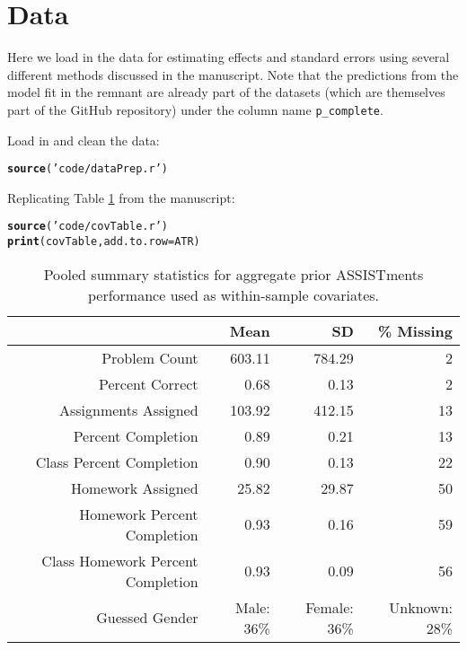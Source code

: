 \documentclass[12pt]{article}\usepackage[]{graphicx}\usepackage[]{color}
\makeatletter
\newcommand{\hlstr}[1]{\textcolor[rgb]{0.192,0.494,0.8}{#1}}%
\newcommand{\hlstd}[1]{\textcolor[rgb]{0.345,0.345,0.345}{#1}}%
\newcommand{\hlkwc}[1]{\textcolor[rgb]{0.333,0.667,0.333}{#1}}%
\newcommand{\hlkwd}[1]{\textcolor[rgb]{0.737,0.353,0.396}{\textbf{#1}}}%
\newenvironment{kframe}{%
 \def\at@end@of@kframe{}%
 \ifinner\ifhmode%
  \def\at@end@of@kframe{\end{minipage}}%
  \begin{minipage}{\columnwidth}%
 \fi\fi%
 \def\FrameCommand##1{\hskip\@totalleftmargin \hskip-\fboxsep
 \colorbox{shadecolor}{##1}\hskip-\fboxsep
     \hskip-\linewidth \hskip-\@totalleftmargin \hskip\columnwidth}%
 \MakeFramed {\advance\hsize-\width
   \@totalleftmargin\z@ \linewidth\hsize
   \@setminipage}}%
 {\par\unskip\endMakeFramed%
 \at@end@of@kframe}
\newenvironment{knitrout}{}{} %
\makeatother
\begin{document}
\section{Data}

Here we load in the data for estimating effects and standard errors
using several different methods discussed in the manuscript.
Note that the predictions from the model fit in the remnant are
already part of the datasets (which are themselves part of the GitHub
repository) under the column name \texttt{p\_complete}.

Load in and clean the data:\\

\begin{knitrout}
\color{fgcolor}\begin{kframe}
\begin{alltt}
\hlkwd{source}\hlstd{(}\hlstr{'code/dataPrep.r'}\hlstd{)}
\end{alltt}
\end{kframe}
\end{knitrout}

Replicating Table \ref{tab:covariates} from the manuscript:

\begin{kframe}
\begin{alltt}
\hlkwd{source}\hlstd{(}\hlstr{'code/covTable.r'}\hlstd{)}
\hlkwd{print}\hlstd{(covTable,} \hlkwc{add.to.row}\hlstd{=ATR)}
\end{alltt}
\end{kframe}%
\begin{table}[ht]
\centering
\begin{tabular}{rrrr}
  \hline
 & Mean & SD & \% Missing \\ 
  \hline
Problem Count & 603.11 & 784.29 & 2 \\ 
  Percent Correct & 0.68 & 0.13 & 2 \\ 
  Assignments Assigned & 103.92 & 412.15 & 13 \\ 
  Percent Completion & 0.89 & 0.21 & 13 \\ 
  Class Percent Completion & 0.90 & 0.13 & 22 \\ 
  Homework Assigned & 25.82 & 29.87 & 50 \\ 
  Homework Percent Completion & 0.93 & 0.16 & 59 \\ 
  Class Homework Percent Completion & 0.93 & 0.09 & 56 \\ 
   Guessed Gender&Male: 36\%&Female: 36\%&Unknown: 28\%\\
 \hline
\end{tabular}
\caption{Pooled summary statistics for aggregate prior ASSISTments performance used as within-sample covariates.} 
\label{tab:covariates}
\end{table}
\end{document}
